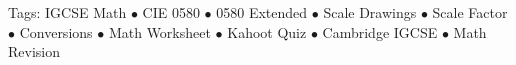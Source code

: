 \documentclass[11pt,a4paper]{article}
\begin{document}
\vspace{14pt}
\begin{center}
  \sffamily\scriptsize\textcolor{textmuted}{
    Tags: IGCSE Math $\bullet$ CIE 0580 $\bullet$ 0580 Extended $\bullet$ Scale Drawings $\bullet$ Scale Factor $\bullet$ Conversions $\bullet$ Math Worksheet $\bullet$ Kahoot Quiz $\bullet$ Cambridge IGCSE $\bullet$ Math Revision
  }
\end{center}
\end{document}
